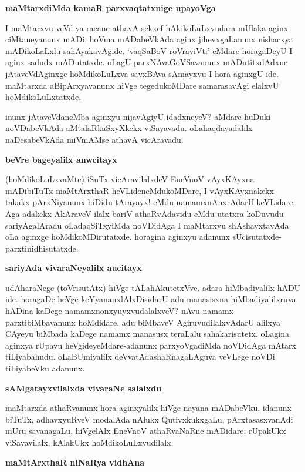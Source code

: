 {\bigskip
\noindent
{\large\bf maMtarxdiMda kamaR parxvaqtatxnige upayoVga}}\label{page117}
\medskip

\noindent
I maMtarxvu veVdiya racane athavA sekxcf hAkikoLuLxvudara mUlaka 
aginx ciMtaneyanunx mADi, hoVma mADabeVkAda aginx jihevxgaLanunx nishacxya mADikoLaLxlu sahAyakavAgide. `vaqSaBoV roVra\-viVti' eMdare\- horagaDeyU I aginx sadudx mADutatxde. oLagU parxNAvaGoVSavanunx mADutitxdAdxne jAtaveVdA\-ginxge hoMdikoLuLxva savxBAva sAmayxvu I hora aginxgU ide. maMtarxda aBipArxyavanunx hiVge tegedu\-koMDare samarasavAgi elalxvU hoMdikoLuLxtatxde.

inunx jAtaveVdaneMba aginxyu nijavAgiyU idadxneyeV? aMdare 
huDuki noVDabeVkAda aMta\-laR\-kaSxyXkekx viSayavadu. oLahaqdayadalilx naDesabeVkAda miVmAMse athavA vicAravadu.

{\bigskip
\noindent
{\large\bf beVre bageyalilx anwcitayx}}\label{page117}
\medskip

\noindent
(hoMdikoLuLxvaMte) iSuTx vicAravilalxdeV EneVnoV vAyxKAyxna mADibiTuTx 
maMtArxthaR heVLide\-neMdu\-koMDare, I vAyxKAyxnakekx takakx pArxNiyanunx 
hiDidu tArayayx! eMdu namamxnAnxrAdarU keVLidare, Aga adakekx 
AkA\-raveV ilalx-bariV athaRvAdavidu eMdu utatxra koDuvudu 
sariyAgalAradu oLadaqSiTx\-yiMda noVDi\-dAga I maMtarxvu shAshavxtavAda oLa aginxge hoMdikoMDirutatxde. horagina aginxyu adanunx sUcisu\-tatxde-parxtinidhisutatxde.

{\bigskip
\noindent
{\large\bf sariyAda vivaraNeyalilx aucitayx}}\label{page117}
\medskip

\noindent
udAharaNege (toVrisutAtx) hiVge tALahAkutetxVve. adara hiMbadiyalilx 
hADU ide. horagaDe heVge keYyananxlAlxDisidarU adu manasisxna 
hiMbadiyalilxruva \hbox{hADina} kaDege namamxnonxyuyxvudalalxveV? nAvu namamx 
parxtibiMbavanunx hoMdidare, adu biMbaveV AgiruvudilalxvAdarU alilxya CAyeyu biMbada kaDege namamx manasusx teraLalu sahakarisutetx. oLagina aginxya rUpavu heVgideyeMdare-adanunx parxyoVga\-diMda noVDidAga mAtarx tiLiyabahudu. oLaBUmiyalilx deVvatAdashaRna\-gaLA\-guva veVLege noVDi tiLiyabeVku adanunx.

{\bigskip
\noindent
{\large\bf sAMgatayxvilalxda vivaraNe salalxdu}}\label{page118}
\medskip

\noindent
maMtarxda athaRvanunx hora aginxyalilx hiVge nayana mADabeVku. idanunx biTuTx, adhavxyuRveV moda\-lAda nAlukx QutivxkukxgaLu, pArxtasasxvanAdi mUru savanagaLu, hiVgelAlx EneVnoV athaRvaNaRne mADi\-dare; rUpakUkx viSayavilalx. kAlakUkx hoMdikoLuLxvudilalx.

{\bigskip
\noindent
{\large\bf maMtArxthaR niNaRya vidhAna}}\label{page118}
\medskip

